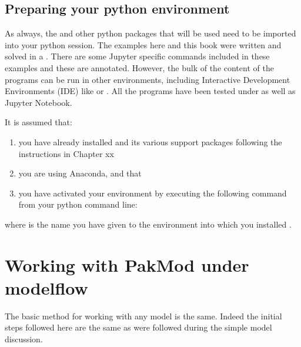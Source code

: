 \documentclass[letterpaper,10pt,english]{jupyterBook}
\begin{document}
\section{Preparing your python environment}
\label{\detokenize{content/05_WBModels/LoadingWBModel:preparing-your-python-environment}}
\sphinxAtStartPar
As always, the  and other python packages that will be used need to be imported into your python session.  The examples here and this book were written and solved in a . There are some Jupyter specific commands included in these examples and these are annotated. However, the bulk of the content of the programs can be run in other environments, including Interactive Development Environments (IDE) like or .  All the programs have been tested under  as well as Jupyter Notebook.

\sphinxAtStartPar
It is assumed that:
\begin{enumerate}
%
\item {} 
\sphinxAtStartPar
you have already installed  and its various support packages following the instructions in Chapter xx

\item {} 
\sphinxAtStartPar
you are using Anaconda, and that

\item {} 
\sphinxAtStartPar
you have activated your  environment by executing the following command from your python command line:

\end{enumerate}

\begin{sphinxVerbatim}[commandchars=\\\{\}]
  
\end{sphinxVerbatim}

\sphinxAtStartPar
where  is the name you have given to the  environment into which you installed .


\chapter{Working with PakMod under modelflow}
\label{\detokenize{content/05_WBModels/LoadingWBModel:working-with-pakmod-under-modelflow}}
\sphinxAtStartPar
The basic method for working with any model is the same. Indeed the initial steps followed here are the same as were followed during the simple model discussion.
\end{document}
